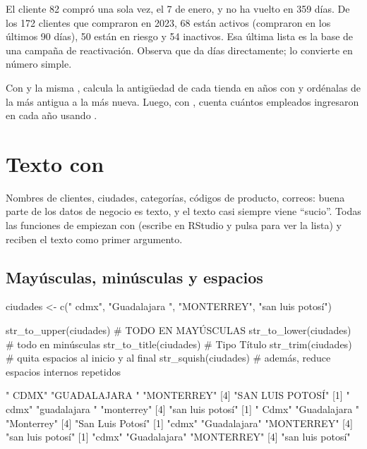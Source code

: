 El cliente 82 compró una sola vez, el 7 de enero, y no ha vuelto en 359 días.
De los 172 clientes que compraron en 2023, 68 están activos (compraron en
los últimos 90 días), 50 están en riesgo y 54 inactivos. Esa última lista es
la base de una campaña de reactivación. Observa que  da días directamente;  lo convierte en
número simple.

\begin{hazlotu}
Con  y la misma , calcula la
antigüedad de cada tienda en años con  y ordénalas de
la más antigua a la más nueva. Luego, con , cuenta cuántos
empleados ingresaron en cada año usando .
\end{hazlotu}

\section{Texto con \texorpdfstring{}{stringr}}
\label{sec:m2-stringr}

Nombres de clientes, ciudades, categorías, códigos de producto, correos:
buena parte de los datos de negocio es texto, y el texto casi siempre viene
``sucio''. Todas las funciones de  empiezan con
 (escribe  en RStudio y pulsa  para
ver la lista) y reciben el texto como primer argumento.

\subsection{Mayúsculas, minúsculas y espacios}

\begin{rcode}
ciudades <- c("  cdmx", "Guadalajara ", "MONTERREY", "san  luis   potosí")

str_to_upper(ciudades)    # TODO EN MAYÚSCULAS
str_to_lower(ciudades)    # todo en minúsculas
str_to_title(ciudades)    # Tipo Título
str_trim(ciudades)        # quita espacios al inicio y al final
str_squish(ciudades)      # además, reduce espacios internos repetidos
\end{rcode}
\begin{rsalida}
[1] "  CDMX"             "GUADALAJARA "       "MONTERREY"         
[4] "SAN  LUIS   POTOSÍ"
[1] "  cdmx"             "guadalajara "       "monterrey"         
[4] "san  luis   potosí"
[1] "  Cdmx"             "Guadalajara "       "Monterrey"         
[4] "San  Luis   Potosí"
[1] "cdmx"               "Guadalajara"        "MONTERREY"         
[4] "san  luis   potosí"
[1] "cdmx"            "Guadalajara"     "MONTERREY"      
[4] "san luis potosí"
\end{rsalida}

